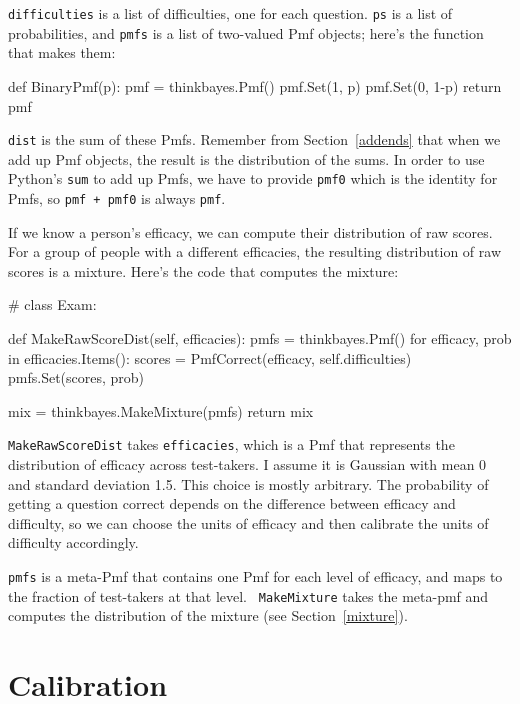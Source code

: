 \documentclass[12pt]{book}
\theoremstyle{exercise}
\begin{document}
{\tt difficulties} is a list of difficulties, one for each question.
{\tt ps} is a list of probabilities, and {\tt pmfs} is a list of
two-valued Pmf objects; here's the function that makes them:

\begin{code}
def BinaryPmf(p):
    pmf = thinkbayes.Pmf()
    pmf.Set(1, p)
    pmf.Set(0, 1-p)
    return pmf
\end{code}

{\tt dist} is the sum of these Pmfs.  Remember from Section~\ref{addends}
that when we add up Pmf objects, the result is the distribution
of the sums.  In order to use Python's {\tt sum} to add up Pmfs,
we have to provide {\tt pmf0} which is the identity for Pmfs,
so {\tt pmf + pmf0} is always {\tt pmf}.

If we know a person's efficacy, we can compute their distribution
of raw scores.  For a group of people with a different efficacies, the
resulting distribution of raw scores is a mixture.  Here's the code
that computes the mixture:

\begin{code}
# class Exam:

    def MakeRawScoreDist(self, efficacies):
        pmfs = thinkbayes.Pmf()
        for efficacy, prob in efficacies.Items():
            scores = PmfCorrect(efficacy, self.difficulties)
            pmfs.Set(scores, prob)

        mix = thinkbayes.MakeMixture(pmfs)
        return mix
\end{code}

{\tt MakeRawScoreDist} takes {\tt efficacies}, which is a Pmf that
represents the distribution of efficacy across test-takers.  I assume
it is Gaussian with mean 0 and standard deviation 1.5.  This
choice is mostly arbitrary.  The probability of getting a question
correct depends on the difference between efficacy and difficulty, so
we can choose the units of efficacy and then calibrate the units of
difficulty accordingly.  

{\tt pmfs} is a meta-Pmf that contains one Pmf for each level of
efficacy, and maps to the fraction of test-takers at that level.  {\tt
  MakeMixture} takes the meta-pmf and computes the distribution of the
mixture (see Section~\ref{mixture}).  


\section{Calibration}
\end{document}
